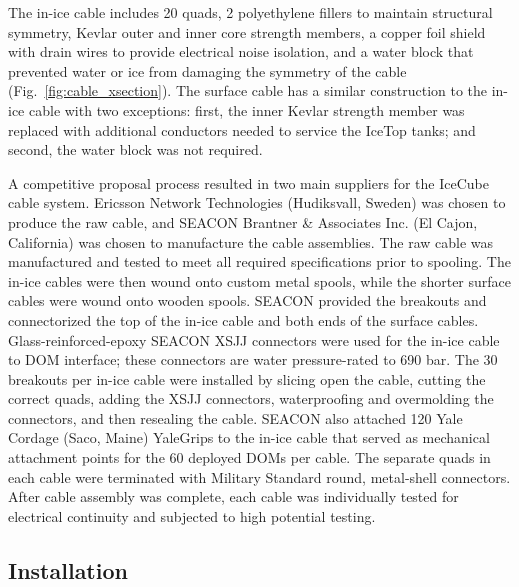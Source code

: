 The in-ice cable includes 20 quads, 2 polyethylene fillers to maintain structural
symmetry, Kevlar outer and inner core strength members, a copper foil
shield with drain wires to provide electrical noise isolation, and a water
block that prevented water or ice from damaging the symmetry of the
cable (Fig.~\ref{fig:cable_xsection}). The surface cable has a similar
construction to the in-ice 
cable with two exceptions: first, the inner Kevlar strength member was replaced
with additional conductors needed to service the IceTop tanks; and second, the
water block was not required.

A competitive proposal process resulted in two main suppliers for the IceCube
cable system.  Ericsson Network Technologies (Hudiksvall, Sweden) was chosen
to produce the raw cable, and SEACON Brantner \& Associates Inc. (El Cajon,
California) was chosen to manufacture the cable assemblies. The raw
cable was manufactured and tested to meet all required specifications prior to spooling.  The in-ice cables were then
wound onto custom metal spools, while the shorter surface cables were wound
onto wooden spools. SEACON provided the breakouts
and connectorized the top of the in-ice cable and both ends of the surface
cables. Glass-reinforced-epoxy SEACON XSJJ connectors were used for the in-ice
cable to DOM interface; these connectors are water pressure-rated to 690
bar. The 30 breakouts per in-ice cable were installed by 
slicing open the cable, cutting the correct quads, adding the
XSJJ connectors, waterproofing and overmolding the connectors, and then
resealing the cable. SEACON also
attached 120 Yale Cordage (Saco, Maine) YaleGrips to the in-ice
cable that served as mechanical attachment points for the 60 deployed DOMs
per cable. The separate quads in each cable were terminated with
Military Standard round,
metal-shell connectors. After cable assembly was complete, 
each cable was individually tested for electrical continuity and subjected to high
potential testing. 

\subsection{Installation}

